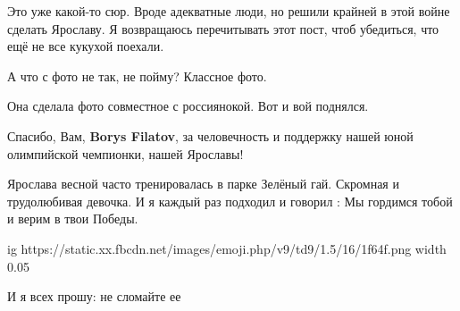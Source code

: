 \begin{itemize}
 

Это уже какой-то сюр. Вроде адекватные люди, но решили крайней в этой войне
сделать Ярославу. Я возвращаюсь перечитывать этот пост, чтоб убедиться, что ещё
не все кукухой поехали.

 
А что с фото не так, не пойму? Классное фото.

\begin{itemize}
 
Она сделала фото совместное с россиянокой. Вот и вой поднялся.
\end{itemize}

 
Спасибо, Вам, \textbf{Borys Filatov}, за человечность и поддержку нашей юной олимпийской чемпионки, нашей Ярославы!

 
Ярослава весной часто тренировалась в парке Зелёный гай. Скромная и
трудолюбивая девочка. И я каждый раз подходил и говорил : Мы гордимся тобой и
верим в твои Победы. 

\ifcmt
  ig https://static.xx.fbcdn.net/images/emoji.php/v9/td9/1.5/16/1f64f.png
  width 0.05
\fi

И я всех прошу: не сломайте ее


\end{itemize}
